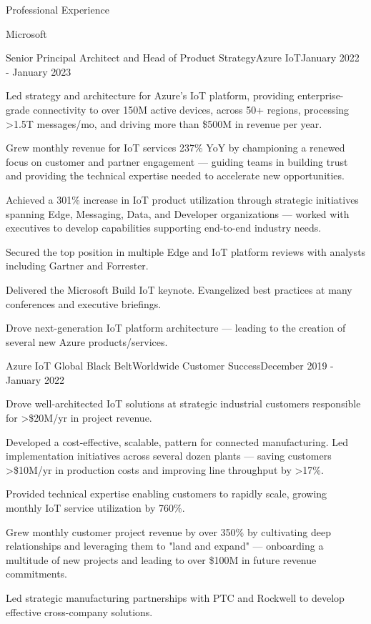 \documentclass{resume} %
\begin{document}
\begin{rSection}{Professional Experience}
  \begin{rCompany}{Microsoft}{}{}
     \begin{rRole}{Senior Principal Architect and Head of Product Strategy}{Azure IoT}{January 2022 - January 2023}
        \item Led strategy and architecture for Azure's IoT platform, providing enterprise-grade connectivity to over 150M active devices, across 50+ regions, processing >1.5T messages/mo, and driving more than \$500M in revenue per year.
        \item Grew monthly revenue for IoT services 237\% YoY by championing a renewed focus on customer and partner engagement --- guiding teams in building trust and providing the technical expertise needed to accelerate new opportunities.
        \item Achieved a 301\% increase in IoT product utilization through strategic initiatives spanning Edge, Messaging, Data, and Developer organizations --- worked with executives to develop capabilities supporting end-to-end industry needs.
        \item Secured the top position in multiple Edge and IoT platform reviews with analysts including Gartner and Forrester.
        \item Delivered the Microsoft Build IoT keynote. Evangelized best practices at many conferences and executive briefings.
        \item Drove next-generation IoT platform architecture --- leading to the creation of several new Azure products/services.
    
    \end{rRole}
    
    \begin{rRole}{Azure IoT Global Black Belt}{Worldwide Customer Success}{December 2019 - January 2022}
        \item Drove well-architected IoT solutions at strategic industrial customers responsible for >\$20M/yr in project revenue. 
        \item Developed a cost-effective, scalable, pattern for connected manufacturing. Led implementation initiatives across several dozen plants --- saving customers >\$10M/yr in production costs and improving line throughput by >17\%. 
        \item Provided technical expertise enabling customers to rapidly scale, growing monthly IoT service utilization by 760\%.
        \item Grew monthly customer project revenue by over 350\% by cultivating deep relationships and leveraging them to "land and expand" --- onboarding a multitude of new projects and leading to over \$100M in future revenue commitments.\
        \item Led strategic manufacturing partnerships with PTC and Rockwell to develop effective cross-company solutions.
    \end{rRole}
    

\end{rCompany}
\end{rSection}
\end{document}
